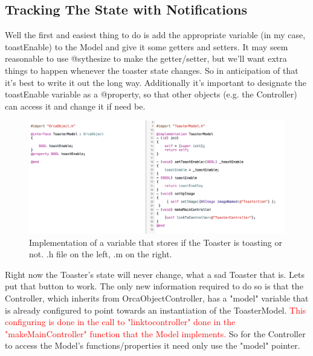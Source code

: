 \documentclass[12pt,a4paper]{article}
\begin{document}
\subsection{Tracking The State with Notifications} 
 Well the first and easiest thing to do is add the appropriate variable (in my case, toastEnable) to the Model and give it some getters and setters.
 It may seem reasonable to use @sythesize to make the getter/setter, but we'll want extra things to happen whenever the toaster state changes.
 So in anticipation of that it's best to write it out the long way.
 Additionally it's important to designate the toastEnable variable as a @property, so that other objects (e.g. the Controller) can access it and change it if need be.
 
  \begin{figure}[h]
 \begin{center}
 \includegraphics[width=1.0\textwidth]{ToastEnableExample}
 \caption{Implementation of a variable that stores if the Toaster is toasting or not. .h file on the left, .m on the right.\label{fig:ToastEnableExample}}
 \end{center}
 \end{figure}
 
Right now the Toaster's state will never change, what a sad Toaster that is.
 Lets put that button to work. 
 The only new information required to do so is that the Controller, which inherits from OrcaObjectController, has a "model" variable that is already configured to point towards an instantiation of the ToasterModel.
 \textcolor{red}{This configuring is done in the call to "linktocontroller" done in the "makeMainController" function that the Model implements.}
 So for the Controller to access the Model's functions/properties it need only use the "model" pointer.
 
\end{document}

